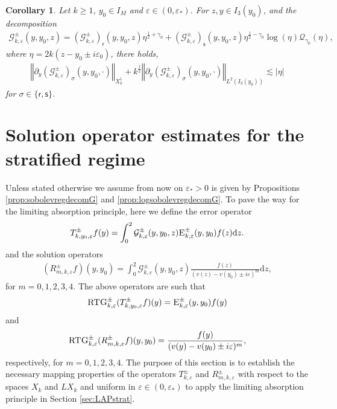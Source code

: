 \documentclass[11pt,reqno]{amsproc}
\newtheorem{corollary}[proposition]{Corollary}
\theoremstyle{definition}
\numberwithin{equation}{section}
\newcommand{\scE}{{\textsc{E}}}
\newcommand{\G}{{\mathcal{G}}}
\newcommand{\Q}{{\mathcal{Q}}}
\newcommand{\sr}{{\mathsf{r}}}
\newcommand{\s}{{\mathsf{s}}}
\renewcommand{\d}{\mathrm{d}}
\newcommand{\ep}{\varepsilon}
\begin{document}
\begin{corollary}\label{cor:logsobolevregpartialdecomG}
Let $k\geq 1$, $y_0\in I_M$ and $\ep\in (0,\ep_*)$. For $z,y\in I_3(y_0)$, and the decomposition
\begin{align*}
\G_{k,\ep}^\pm(y,y_0,z) = \left( \G_{k,\ep}^\pm\right)_\sr(y,y_0,z) \eta^{\frac12 + \gamma_0} + \left( \G_{k,\ep}^\pm\right)_\s(y,y_0,z) \eta^{\frac12 - \gamma_0}\log(\eta)\Q_{\gamma_0}(\eta) ,
\end{align*}
where $\eta=2k(z-y_0\pm i\ep_0)$, there holds, 
\begin{align*}
\left\Vert \partial_y\left( \G_{k,\ep}^\pm\right)_\sigma(y,y_0,\cdot) \right\Vert_{X_k^1} + k^\frac12 \left\Vert \partial_y\left( \G_{k,\ep}^\pm \right)_\sigma(y,y_0,\cdot) \right \Vert_{L^2(I_3(y_0))}\lesssim |\eta|
\end{align*}
for $\sigma\in \lbrace \sr, \s \rbrace$.
\end{corollary}


\section{Solution operator estimates for the stratified regime}\label{sec:solopstrat}
Unless stated otherwise we assume from now on $\ep_*>0$ is given by Propositions \ref{prop:sobolevregdecomG} and \ref{prop:logsobolevregdecomG}. To pave the way for the limiting absorption principle, here we define the error operator
\begin{align}\label{eq:defsolopT}
T_{k,y_0,\ep}^\pm f(y) = \int_{0} ^{2} \G_{k,\ep}^\pm(y,y_0,z)\scE_{k,\ep}^\pm(y,y_0) f(z) \d z.
\end{align}
and the solution operators
\begin{align}\label{eq:defsolopR}
(R_{m,k,\ep}^\pm f)(y,y_0) = \int_0^2\G_{k,\ep}^\pm(y,y_0,z)\frac{f(z)}{(v(z)-v(y_0)\pm i\ep)^m} \d z,
\end{align}
for $m=0,1,2,3,4$. The above operators are such that
\begin{equation*}
\textsc{RTG}_{k,\ep}^\pm  (T_{k,y_0,\ep}^\pm f)(y) = \scE_{k,\ep}^\pm(y,y_0) f(y)
\end{equation*}
and
\begin{equation*}
\textsc{RTG}_{k,\ep}^\pm  (R_{m,k,\ep}^\pm f)(y,y_0) =  \frac{f(y)}{(v(y)-v(y_0)\pm i\ep)^m},
\end{equation*}
respectively, for $m=0,1,2,3,4$. The purpose of this section is to establish the necessary mapping properties of the operators $T_{k,\ep}^\pm$ and $R_{m,k,\ep}^\pm$ with respect to the spaces $X_k$ and $LX_k$ and uniform in $\ep\in (0,\ep_*)$ to apply the limiting absorption principle in Section \ref{sec:LAPstrat}.
\end{document}
